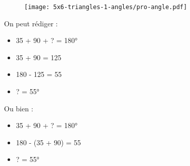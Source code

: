 \begin{minipage}[t]{0.3\textwidth}
  \begin{figure}[H]
    \centering
    \texttt{[image: 5x6-triangles-1-angles/pro-angle.pdf]}
  \end{figure} 
\end{minipage}
\begin{minipage}[t]{0.33\textwidth}
  On peut rédiger :
  \begin{itemize}[label={$\bullet$}]
    \item 35 + 90 + ? = 180° 
    \item 35 + 90 = 125
    \item 180 - 125 = 55
    \item ? = 55°
  \end{itemize}  
\end{minipage}
\begin{minipage}[t]{0.33\textwidth}
  Ou bien :
  \begin{itemize}[label={$\bullet$}]
    \item 35 + 90 + ? = 180° 
    \item 180 - (35 + 90) = 55
    \item ? = 55°
  \end{itemize}  
\end{minipage}

